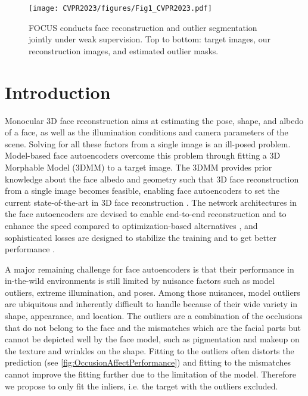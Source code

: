\documentclass[10pt,twocolumn,letterpaper]{article}
\begin{document}
\begin{figure}
  \centering
  \footnotesize
  \texttt{[image: CVPR2023/figures/Fig1\_CVPR2023.pdf]}
  \caption{FOCUS conducts face reconstruction and outlier segmentation jointly under weak supervision. Top to bottom: target images, our reconstruction images, and estimated outlier masks.}
 \label{fig:intro}
\end{figure}

\section{Introduction}
\label{sec:intro}



Monocular 3D face reconstruction aims at estimating the pose, shape, and albedo of a face, as well as the illumination conditions and camera parameters of the scene.
Solving for all these factors from a single image is an ill-posed problem.
Model-based face autoencoders \cite{tewari2017mofa} overcome this problem through fitting a 3D Morphable Model (3DMM) \cite{blanz2003face,egger20203d} to a target image.
The 3DMM provides prior knowledge about the face albedo and geometry such that 3D face reconstruction from a single image becomes feasible, enabling face autoencoders to set the current state-of-the-art in 3D face reconstruction \cite{deng2019accurate}. 
The network architectures in the face autoencoders are devised to enable end-to-end reconstruction and to enhance the speed compared to optimization-based alternatives \cite{kortylewski2018informed,zhu2015discriminative}, and sophisticated losses are designed to stabilize the training and to get better performance \cite{deng2019accurate}.







A major remaining challenge for face autoencoders is that their performance in in-the-wild environments is still limited by nuisance factors such as model outliers, extreme illumination, and poses. Among those nuisances, model outliers are ubiquitous and inherently difficult to handle because of their wide variety in shape, appearance, and location.
The outliers are a combination of the occlusions that do not belong to the face and the mismatches which are the facial parts but cannot be depicted well by the face model, such as pigmentation and makeup on the texture and wrinkles on the shape. Fitting to the outliers often distorts the prediction (see \cref{fig:OccusionAffectPerformance}) and fitting to the mismatches cannot improve the fitting further due to the limitation of the model. Therefore we propose to only fit the inliers, i.e. the target with the outliers excluded.
\end{document}
